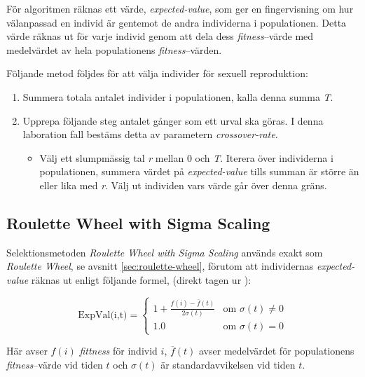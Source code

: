 \documentclass[titlepage, a4paper, 12pt]{article}
\begin{document}
\begin{itemize}
För algoritmen räknas ett värde, \textit{expected-value}, som ger en
fingervisning om hur välanpassad en individ är gentemot de andra
individerna i populationen. Detta värde räknas ut för varje individ
genom att dela dess \textit{fitness}–värde med medelvärdet av hela
populationens \textit{fitness}–värden.

Följande metod följdes för att välja individer för sexuell
reproduktion:

\begin{enumerate}
\item Summera totala antalet individer i populationen, kalla denna
  summa \textit{T}.
\item Upprepa följande steg antalet gånger som ett urval ska göras. I
  denna laboration fall bestäms detta av parametern
  \textit{crossover-rate}.
  \begin{itemize}
  \item Välj ett slumpmässig tal \textit{r} mellan 0 och
    \textit{T}. Iterera över individerna i populationen, summera
    värdet på \textit{expected-value} tills summan är större än eller
    lika med \textit{r}. Välj ut individen vars värde går över denna gräns.
  \end{itemize}
\end{enumerate}

\subsection{Roulette Wheel with Sigma Scaling}
Selektionsmetoden \textit{Roulette Wheel with Sigma Scaling} används
exakt som \textit{Roulette Wheel}, se avsnitt
\ref{sec:roulette-wheel}, förutom att individernas
\textit{expected-value} räknas ut enligt följande formel, (direkt
tagen ur \cite{gen-intro}):

\begin{displaymath}
  \textrm{ExpVal(i,t)} = \left\{ \begin{array}{ll}
      1 + \frac{f(i) - \overline{f}(t)}{2\sigma(t)} & \textrm{om } \sigma(t) \neq 0 \\
      1.0 & \textrm{om } \sigma(t) = 0
    \end{array} \right.
\end{displaymath}
  
Här avser $f(i)$ \textit{fittness} för individ $i$, $\overline{f}(t)$
avser medelvärdet för populationens \textit{fitness}–värde vid tiden
$t$ och $\sigma(t)$ är standardavvikelsen vid tiden $t$.



\end{itemize}
\end{document}
